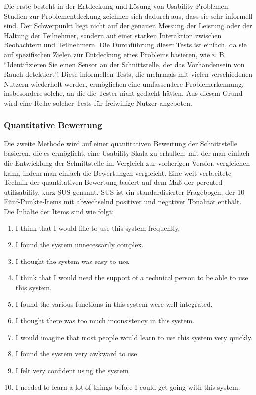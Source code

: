 Die erste besteht in der Entdeckung und Lösung von Usability-Problemen.
Studien zur Problementdeckung zeichnen sich dadurch aus, dass sie sehr informell sind.
Der Schwerpunkt liegt nicht auf der genauen Messung der Leistung oder der Haltung der Teilnehmer, sondern auf einer starken Interaktion zwischen Beobachtern und Teilnehmern.
Die Durchführung dieser Tests ist einfach, da sie auf spezifischen Zielen zur Entdeckung eines Problems basieren, wie z. B. ``Identifizieren Sie einen Sensor an der Schnittstelle, der das Vorhandensein von Rauch detektiert''.
Diese informellen Tests, die mehrmals mit vielen verschiedenen Nutzern wiederholt werden, ermöglichen eine umfassendere Problemerkennung, insbesondere solche, an die die Tester nicht gedacht hätten.
Aus diesem Grund wird eine Reihe solcher Tests für freiwillige Nutzer angeboten.

\subsubsection{Quantitative Bewertung}

Die zweite Methode wird auf einer quantitativen Bewertung der Schnittstelle basieren, die es ermöglicht, eine Usability-Skala zu erhalten, mit der man einfach die Entwicklung der Schnittstelle im Vergleich zur vorherigen Version vergleichen kann, indem man einfach die Bewertungen vergleicht.
Eine weit verbreitete Technik der quantitativen Bewertung basiert auf dem Maß der percuted utilisability, kurz \ac{SUS} genannt\cite{usability}.
\ac{SUS} ist ein standardisierter Fragebogen, der 10 Fünf-Punkte-Items mit abwechselnd positiver und negativer Tonalität enthält. Die Inhalte der Items sind wie folgt:

\begin{enumerate}
  \item I think that I would like to use this system frequently.
  \item I found the system unnecessarily complex.
  \item I thought the system was easy to use.
  \item I think that I would need the support of a technical person to be able to use this system.
  \item I found the various functions in this system were well integrated.
  \item I thought there was too much inconsistency in this system.
  \item I would imagine that most people would learn to use this system very quickly.
  \item I found the system very awkward to use.
  \item I felt very confident using the system.
  \item I needed to learn a lot of things before I could get going with this system.
\end{enumerate}

